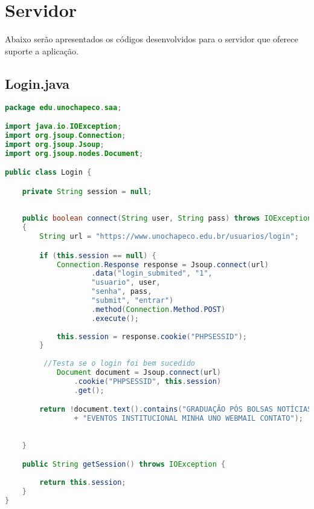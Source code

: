 \chapter{Servidor}

Abaixo serão apresentados os códigos desenvolvidos para o servidor que oferece suporte a aplicação.

\section{Login.java}
\begin{lstlisting}[language=java, frame=single]
package edu.unochapeco.saa;

import java.io.IOException;
import org.jsoup.Connection;
import org.jsoup.Jsoup;
import org.jsoup.nodes.Document;

public class Login {

    private String session = null;
    
    
    public boolean connect(String user, String pass) throws IOException 
    {
        String url = "https://www.unochapeco.edu.br/usuarios/login";

        if (this.session == null) {
            Connection.Response response = Jsoup.connect(url)
                    .data("login_submited", "1",
                    "usuario", user,
                    "senha", pass,
                    "submit", "entrar")
                    .method(Connection.Method.POST)
                    .execute();
            
            this.session = response.cookie("PHPSESSID");
        }
        
         //Testa se o login foi bem sucedido
            Document document = Jsoup.connect(url)
                .cookie("PHPSESSID", this.session)
                .get();

        return !document.text().contains("GRADUAÇÃO PÓS BOLSAS NOTÍCIAS UNOWEBTV "
                + "EVENTOS INSTITUCIONAL MINHA UNO WEBMAIL CONTATO");
        
        
    }

    public String getSession() throws IOException {
        
        return this.session;
    }
}
\end{lstlisting}

